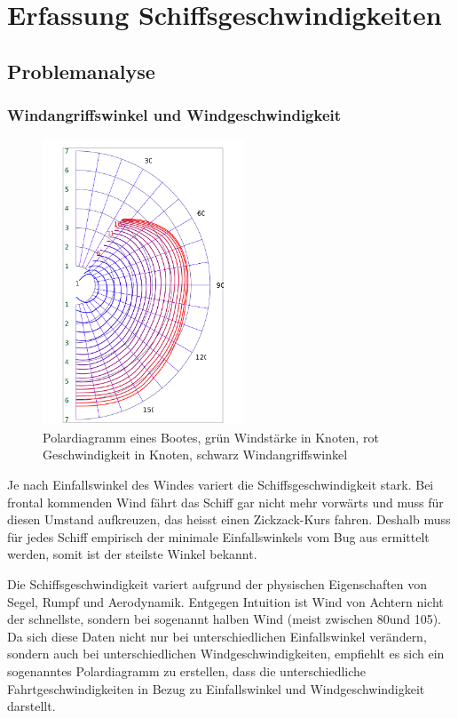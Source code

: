 
\section{Erfassung Schiffsgeschwindigkeiten}

\subsection{Problemanalyse}
\subsubsection{Windangriffswinkel und Windgeschwindigkeit}

\begin{figure} 
\centering
\includegraphics[width=6cm]{img/polardiagramm}
\caption{Polardiagramm eines Bootes, grün Windstärke in Knoten, rot
Geschwindigkeit in Knoten, schwarz Windangriffswinkel}
\label{polardiagram}
\end{figure}

Je nach Einfallswinkel des Windes variert die Schiffsgeschwindigkeit
stark. Bei frontal kommenden Wind fährt das Schiff gar nicht mehr
vorwärts und muss für diesen Umstand aufkreuzen, das heisst einen
Zickzack-Kurs fahren. Deshalb muss für jedes Schiff empirisch der
minimale Einfallswinkels vom Bug aus ermittelt werden, somit ist der
steilste Winkel bekannt.

Die Schiffsgeschwindigkeit variert aufgrund der physischen Eigenschaften
von Segel, Rumpf und Aerodynamik. Entgegen Intuition ist Wind von
Achtern nicht der schnellste, sondern bei sogenannt halben Wind (meist
zwischen 80\degree und 105\degree). Da sich diese Daten nicht nur bei
unterschiedlichen Einfallswinkel verändern, sondern auch bei
unterschiedlichen Windgeschwindigkeiten, empfiehlt es sich ein
sogenanntes Polardiagramm zu erstellen, dass die unterschiedliche
Fahrtgeschwindigkeiten in Bezug zu Einfallswinkel und
Windgeschwindigkeit darstellt.

